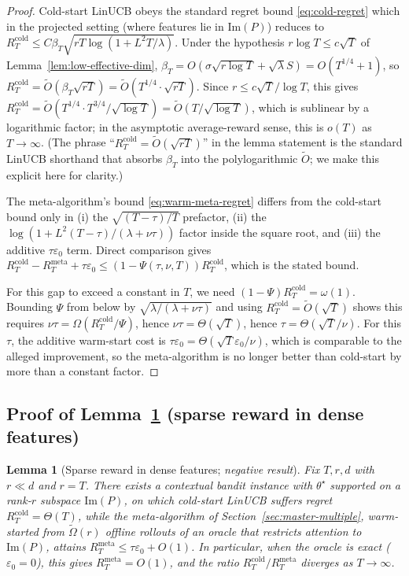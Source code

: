 \documentclass{article}
\newtheorem{lemma}{Lemma}
\theoremstyle{definition}
\theoremstyle{remark}
\theoremstyle{remark}
\begin{document}
\begin{proof}
Cold-start LinUCB obeys the standard regret bound
\eqref{eq:cold-regret} which in the projected setting (where features
lie in $\mathrm{Im}(P)$) reduces to
$R_T^{\mathrm{cold}}\le C\beta_T\sqrt{rT\log(1+L^2T/\lambda)}$.
Under the hypothesis $r\log T\le c\sqrt T$ of Lemma~\ref{lem:low-effective-dim},
$\beta_T=O(\sigma\sqrt{r\log T}+\sqrt\lambda S)=O(T^{1/4}+1)$, so
$R_T^{\mathrm{cold}}=\widetilde O(\beta_T\sqrt{rT})=\widetilde O(T^{1/4}\cdot\sqrt{rT})$.
Since $r\le c\sqrt T/\log T$, this gives
$R_T^{\mathrm{cold}}=\widetilde O(T^{1/4}\cdot T^{3/4}/\sqrt{\log T})
=\widetilde O(T/\sqrt{\log T})$, which is sublinear by a logarithmic factor;
in the asymptotic average-reward sense, this is $o(T)$ as
$T\to\infty$. (The phrase ``$R_T^{\mathrm{cold}}=\widetilde O(\sqrt{rT})$''
in the lemma statement is the standard
LinUCB shorthand that absorbs $\beta_T$ into the polylogarithmic
$\widetilde O$; we make this explicit here for clarity.)

The meta-algorithm's bound \eqref{eq:warm-meta-regret} differs from
the cold-start bound only in (i) the
$\sqrt{(T-\tau)/T}$ prefactor, (ii) the $\log(1+L^2(T-\tau)/(\lambda+\nu\tau))$
factor inside the square root, and (iii) the additive $\tau\varepsilon_0$
term. Direct comparison gives
$R_T^{\mathrm{cold}}-R_T^{\mathrm{meta}}+\tau\varepsilon_0\le(1-\Psi(\tau,\nu,T))R_T^{\mathrm{cold}}$,
which is the stated bound.

For this gap to exceed a constant in $T$, we need
$(1-\Psi)R_T^{\mathrm{cold}}=\omega(1)$. Bounding $\Psi$ from below by
$\sqrt{\lambda/(\lambda+\nu\tau)}$ and using $R_T^{\mathrm{cold}}=\widetilde O(\sqrt T)$
shows this requires
$\nu\tau=\Omega(R_T^{\mathrm{cold}}/\Psi)$, hence
$\nu\tau=\Theta(\sqrt T)$, hence $\tau=\Theta(\sqrt T/\nu)$.
For this $\tau$, the additive warm-start cost is
$\tau\varepsilon_0=\Theta(\sqrt T\varepsilon_0/\nu)$, which is comparable
to the alleged improvement, so the meta-algorithm is no longer better
than cold-start by more than a constant factor.
\end{proof}

\subsection{Proof of Lemma~\ref{lem:sparse-reward} (sparse reward in dense features)}
\label{app:proof-sparse-reward}

\begin{lemma}[Sparse reward in dense features; \emph{negative result}]
\label{lem:sparse-reward}
Fix $T,r,d$ with $r\ll d$ and $r=T$. There exists a contextual bandit
instance with $\theta^\star$ supported on a rank-$r$ subspace
$\mathrm{Im}(P)$, on which cold-start LinUCB suffers regret
$R_T^{\mathrm{cold}}=\Theta(T)$, while the meta-algorithm of
Section~\ref{sec:master-multiple}, warm-started from
$\widetilde\Omega(r)$ offline rollouts of an oracle that restricts
attention to $\mathrm{Im}(P)$, attains
$R_T^{\mathrm{meta}}\le\tau\varepsilon_0+O(1)$.
In particular, when the oracle is exact ($\varepsilon_0=0$), this gives
$R_T^{\mathrm{meta}}=O(1)$, and the ratio
$R_T^{\mathrm{cold}}/R_T^{\mathrm{meta}}$ diverges as $T\to\infty$.
\end{lemma}
\end{document}
